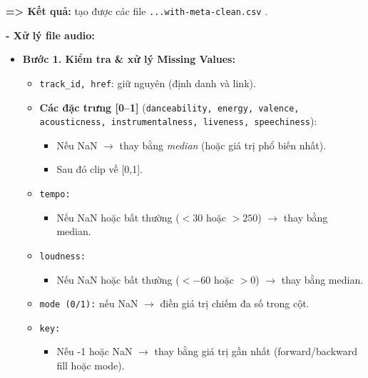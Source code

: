

\par\vspace{1em}
\noindent\textbf{=> Kết quả:} tạo được các file \texttt{...with-meta-clean.csv} .

\clearpage
\textbf{- Xử lý file audio:}

\begin{itemize}
    \item \textbf{Bước 1. Kiểm tra \& xử lý Missing Values:}
    \begin{itemize}
        \item \texttt{track\_id, href}: giữ nguyên (định danh và link).
        \item \textbf{Các đặc trưng [0–1]} (\texttt{danceability, energy, valence, acousticness, instrumentalness, liveness, speechiness}):
        \begin{itemize}
            \item Nếu NaN $\rightarrow$ thay bằng \textit{median} (hoặc giá trị phổ biến nhất).
            \item Sau đó clip về [0,1].
        \end{itemize}
        \item \texttt{tempo:}
        \begin{itemize}
            \item Nếu NaN hoặc bất thường ($<30$ hoặc $>250$) $\rightarrow$ thay bằng median.
        \end{itemize}
        \item \texttt{loudness:}
        \begin{itemize}
            \item Nếu NaN hoặc bất thường ($<-60$ hoặc $>0$) $\rightarrow$ thay bằng median.
        \end{itemize}
        \item \texttt{mode (0/1):} nếu NaN $\rightarrow$ điền giá trị chiếm đa số trong cột.
        \item \texttt{key:}
        \begin{itemize}
            \item Nếu -1 hoặc NaN $\rightarrow$ thay bằng giá trị gần nhất (forward/backward fill hoặc mode).
           
        \end{itemize}
    \end{itemize}


\end{itemize}
